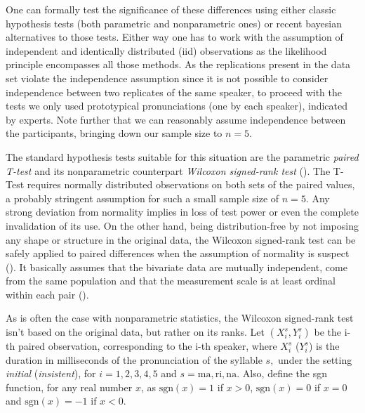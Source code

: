 \documentclass[11pt]{article}
\begin{document}

One can formally test the significance of these differences using either classic hypothesis tests (both parametric and nonparametric ones) or recent bayesian alternatives to those tests. Either way one has to work with the assumption of independent and identically distributed (iid) observations as the likelihood principle encompasses all those methods. As the replications present in the data set violate the independence assumption since it is not possible to consider independence between two replicates of the same speaker, to proceed with the tests we only used prototypical pronunciations (one by each speaker), indicated by experts.  Note further that we can reasonably assume independence between the participants, bringing down our sample size to $n=5.$

The standard hypothesis tests suitable for this situation are the parametric \textit{paired T-test} and its nonparametric counterpart \textit{Wilcoxon signed-rank test} (). The T-Test requires normally distributed observations on both sets of the paired values, a probably stringent assumption for such a small sample size of $n=5$. Any strong deviation from normality implies in loss of test power or even the complete invalidation of its use. On the other hand, being distribution-free by not imposing any shape or structure in the original data, the Wilcoxon signed-rank test can be safely applied to paired differences when the assumption of normality is suspect (). It basically assumes that the bivariate data are mutually independent, come from the same population and that the measurement scale is at least ordinal within each pair  ().

As is often the case with nonparametric statistics, the Wilcoxon signed-rank test isn't based on the original data, but rather on its ranks.
Let $\left(X_i^{s}, Y_i^{s}\right)$ be the i-th paired observation, corresponding to the i-th speaker, where $X_i^{s}$ ($Y_i^{s}$) is the duration in milliseconds of the pronunciation of the syllable $s,$ under the setting {\it{initial}} ({\it{insistent}}), for $i=1,2,3,4,5$ and $s = \textrm{ma}, \textrm{ri}, \textrm{na}$. Also, define the sgn function, for any real number $x$, as $\textrm{sgn}(x) = 1$ if $x>0$, $\textrm{sgn}(x) = 0$ if $x=0$ and $\textrm{sgn}(x) = -1$ if $x<0$.
\end{document}
